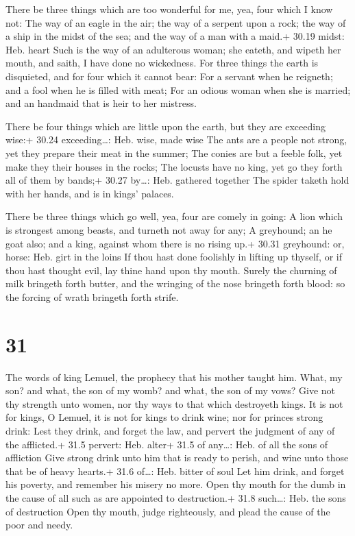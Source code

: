  There be three things which are too wonderful for me, yea,
four which I know not:  The way of an eagle in the air; the
way of a serpent upon a rock; the way of a ship in the midst of the sea;
and the way of a man with a maid.+ 30.19 midst: Heb. heart 
Such is the way of an adulterous woman; she eateth, and wipeth her
mouth, and saith, I have done no wickedness.  For three
things the earth is disquieted, and for four which it cannot bear:
 For a servant when he reigneth; and a fool when he is
filled with meat;  For an odious woman when she is married;
and an handmaid that is heir to her mistress.

 There be four things which are little upon the earth, but
they are exceeding wise:+ 30.24 exceeding\ldots: Heb. wise, made wise
 The ants are a people not strong, yet they prepare their
meat in the summer;  The conies are but a feeble folk, yet
make they their houses in the rocks;  The locusts have no
king, yet go they forth all of them by bands;+ 30.27 by\ldots: Heb.
gathered together  The spider taketh hold with her hands,
and is in kings' palaces.

 There be three things which go well, yea, four are comely
in going:  A lion which is strongest among beasts, and
turneth not away for any;  A greyhound; an he goat also;
and a king, against whom there is no rising up.+ 30.31 greyhound: or,
horse: Heb. girt in the loins  If thou hast done foolishly
in lifting up thyself, or if thou hast thought evil, lay thine hand upon
thy mouth.  Surely the churning of milk bringeth forth
butter, and the wringing of the nose bringeth forth blood: so the
forcing of wrath bringeth forth strife.

\hypertarget{section-30}{%
\section{31}\label{section-30}}

 The words of king Lemuel, the prophecy that his mother
taught him.  What, my son? and what, the son of my womb? and
what, the son of my vows?  Give not thy strength unto women,
nor thy ways to that which destroyeth kings.  It is not for
kings, O Lemuel, it is not for kings to drink wine; nor for princes
strong drink:  Lest they drink, and forget the law, and
pervert the judgment of any of the afflicted.+ 31.5 pervert: Heb. alter+
31.5 of any\ldots: Heb. of all the sons of affliction  Give
strong drink unto him that is ready to perish, and wine unto those that
be of heavy hearts.+ 31.6 of\ldots: Heb. bitter of soul  Let
him drink, and forget his poverty, and remember his misery no more.
 Open thy mouth for the dumb in the cause of all such as are
appointed to destruction.+ 31.8 such\ldots: Heb. the sons of destruction
 Open thy mouth, judge righteously, and plead the cause of
the poor and needy.


